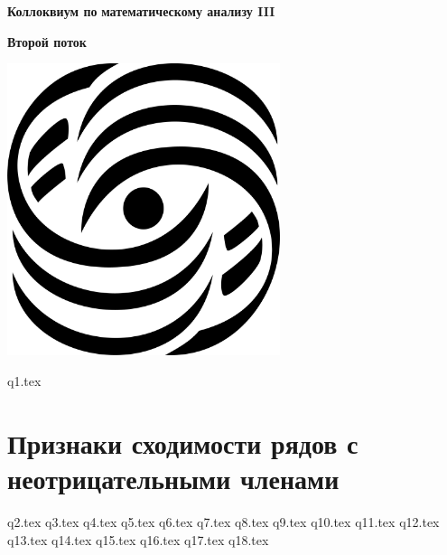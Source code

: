 \documentclass[openany]{book}
\begin{document}
	
	
	\begin{titlepage}
		\centering
		
		\vspace*{2cm}
		
		{\Huge\bfseries Коллоквиум по}
		{\Huge\bfseries математическому анализу III}
		
		{\Huge\bfseries Второй поток}
		
		\vspace*{2.2cm}
		
		\includegraphics[width=0.6\textwidth]{logo.png}
	\end{titlepage}
	\clearpage
	\hypertarget{intro}{}
	\tableofcontents
	\clearpage
	
	\pagestyle{fancy}
	\setcounter{page}{1}
	\fancyhf{}
	\fancyhead[LE]{\thepage}
	\fancyhead[RO]{\thepage}
	
	{q1.tex}
	\section*{Признаки сходимости рядов с неотрицательными членами}
	{q2.tex}
	{q3.tex}
	{q4.tex}
	\newpage
	{q5.tex}
	{q6.tex}
	{q7.tex}
	{q8.tex}
	{q9.tex}
	{q10.tex}   
	{q11.tex}
	{q12.tex}
	{q13.tex}
	{q14.tex}
	{q15.tex}
	{q16.tex}
	{q17.tex}
	{q18.tex}
	
\end{document}
